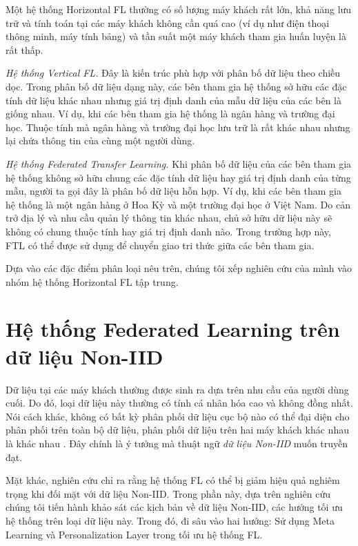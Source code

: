 Một hệ thống Horizontal FL thường có số lượng máy khách rất lớn, khả năng lưu trữ và tính toán tại các máy khách không cần quá cao (ví dụ như điện thoại thông minh, máy tính bảng) và tần suất một máy khách tham gia huấn luyện là rất thấp.

\textit{Hệ thống Vertical FL.} Đây là kiến trúc phù hợp với phân bố dữ liệu theo chiều dọc. Trong phân bố dữ liệu dạng này, các bên tham gia hệ thống sở hữu các đặc tính dữ liệu khác nhau nhưng giá trị định danh của mẫu dữ liệu của các bên là giống nhau. Ví dụ, khi các bên tham gia hệ thống là ngân hàng và trường đại học. Thuộc tính mà ngân hàng và trường đại học lưu trữ là rất khác nhau nhưng lại chứa thông tin của cùng một người dùng.

\textit{Hệ thống Federated Transfer Learning.} Khi phân bố dữ liệu của các bên tham gia hệ thống không sở hữu chung các đặc tính dữ liệu hay giá trị định danh của từng mẫu, người ta gọi đây là phân bố dữ liệu hỗn hợp. Ví dụ, khi các bên tham gia hệ thống là một ngân hàng ở Hoa Kỳ và một trường đại học ở Việt Nam. Do cản trở địa lý và nhu cầu quản lý thông tin khác nhau, chủ sở hữu dữ liệu này sẽ không có chung thuộc tính hay giá trị định danh nào. Trong trường hợp này, FTL có thể được sử dụng để chuyển giao tri thức giữa các bên tham gia.

Dựa vào các đặc điểm phân loại nêu trên, chúng tôi xếp nghiên cứu của mình vào nhóm hệ thống Horizontal FL tập trung.

\section{Hệ thống Federated Learning trên dữ liệu Non-IID}

Dữ liệu tại các máy khách thường được sinh ra dựa trên nhu cầu của người dùng cuối. Do đó, loại dữ liệu này thường có tính cá nhân hóa cao và không đồng nhất. Nói cách khác, không có bất kỳ phân phối dữ liệu cục bộ nào có thể đại diện cho phân phối trên toàn bộ dữ liệu, phân phối dữ liệu trên hai máy khách khác nhau là khác nhau \cite{zhu2021federated}. Đây chính là ý tưởng mà thuật ngữ \textit{dữ liệu Non-IID} muốn truyền đạt.

Mặt khác, nghiên cứu \cite{zhao2018federated} chỉ ra rằng hệ thống FL có thể bị giảm hiệu quả nghiêm trọng khi đối mặt với dữ liệu Non-IID. Trong phần này, dựa trên nghiên cứu \cite{zhu2021federated} chúng tôi tiến hành khảo sát các kịch bản về dữ liệu Non-IID, các hướng tối ưu hệ thống trên loại dữ liệu này. Trong đó, đi sâu vào hai hướng: Sử dụng Meta Learning và Personalization Layer trong tối ưu hệ thống FL.

